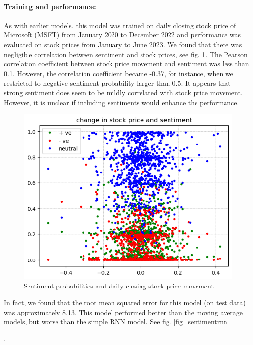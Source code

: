 \documentclass[11pt]{article}
\begin{document}
\paragraph{Training and performance:}{As with earlier models, this model was trained on daily closing stock price of Microsoft (MSFT) from January 2020 to December 2022 and performance was evaluated on stock prices from January to June 2023. We found that there was negligible correlation between sentiment and stock prices, see fig. \ref{fig_sentiment_stock_correlation}. The Pearson correlation coefficient between stock price movement and sentiment was less than 0.1. However, the correlation coefficient became -0.37, for instance, when we restricted to negative sentiment probability larger than 0.5. It appears that strong sentiment does seem to be mildly correlated with stock price movement. However, it is unclear if including sentiments would enhance the performance.
\begin{figure}[h]
		\centering
		\includegraphics[width = .75\linewidth]{graphics/sentiment_stock_correlation.png}
		\caption{Sentiment probabilities and daily closing stock price movement}
		\label{fig_sentiment_stock_correlation}
\end{figure}
In fact, we found that the root mean squared error for this model (on test data) was approximately 8.13. This model performed better than the moving average models, but worse than the simple RNN model. See fig. \ref{fig_sentimentrnn}}.
\end{document}

